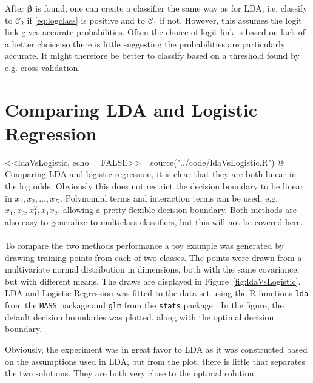 After $\bm \beta$ is found, one can create a classifier the same way as for LDA, i.e. classify to $\mathcal{C}_2$ if \eqref{eq:logclass} is positive and to $\mathcal{C}_1$ if not. However, this assumes the logit link gives accurate probabilities. Often the choice of logit link is based on lack of a better choice so there is little suggesting the probabilities are particularly accurate. It might therefore be better to classify based on a threshold found by e.g. cross-validation.
%
\section{Comparing LDA and Logistic Regression}
\label{sub:LDA and Logistic Regre}
<<ldaVsLogistic, echo = FALSE>>=
source("../code/ldaVsLogistic.R")
@
Comparing LDA and logistic regression, it is clear that they are both linear in the log odds. Obviously this does not restrict the decision boundary to be linear in $x_1, x_2, \ldots , x_D$. Polynomial terms and interaction terms can be used, e.g. $x_1, x_2, x_1^2, x_1 x_2$, allowing a pretty flexible decision boundary. Both methods are also easy to generalize to multiclass classifiers, but this will not be covered here. 
\\
\\
To compare the two methods performance a toy example was generated by drawing  training points from each of two classes. The points were drawn from a multivariate normal distribution in  dimensions, both with the same covariance, but with different means. The draws are displayed in Figure~\ref{fig:ldaVsLogistic}. LDA and Logistic Regression was fitted to the data set using the R functions \verb+lda+ from the \verb+MASS+ package \citep{mass} and \verb+glm+ from the \verb+stats+ package \citep{stats}. In the figure, the default decision boundaries was plotted, along with the optimal decision boundary.

Obviously, the experiment was in great favor to LDA as it was constructed based on the assumptions used in LDA, but from the plot, there is little that separates the two solutions. They are both very close to the optimal solution.

